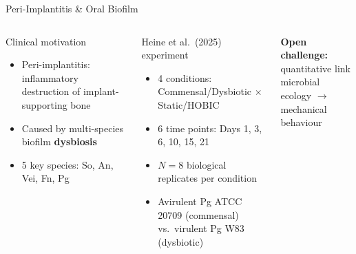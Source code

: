 \documentclass[aspectratio=169,10pt]{beamer}
\begin{document}
\begin{frame}[t]{Peri-Implantitis \& Oral Biofilm}
  \small
  \begin{columns}[T]
      \begin{block}{Clinical motivation}
        \begin{itemize}\setlength{\itemsep}{2pt}
          \item Peri-implantitis: inflammatory destruction of implant-supporting bone
          \item Caused by multi-species biofilm \textbf{dysbiosis}
          \item 5 key species: So, An, Vei, Fn, Pg
        \end{itemize}
      \end{block}
      \vspace{4pt}
      \begin{block}{Heine et al.\ (2025) experiment}
        \begin{itemize}\setlength{\itemsep}{2pt}
          \item 4 conditions: Commensal/Dysbiotic $\times$ Static/HOBIC
          \item 6 time points: Days 1, 3, 6, 10, 15, 21
          \item $N=8$ biological replicates per condition
          \item Avirulent Pg ATCC\,20709 (commensal) vs.\ virulent Pg W83 (dysbiotic)
        \end{itemize}
      \end{block}
      \vspace{4pt}
      \textbf{Open challenge:} quantitative link\\
      \hspace{1.2em}microbial ecology $\to$ mechanical behaviour
      \centering
      \vspace{4pt}
\end{columns}
\end{frame}
\end{document}
